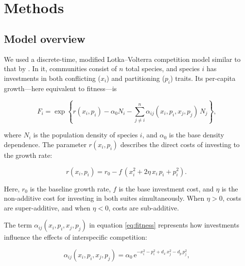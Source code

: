 
\section*{Methods}


\subsection*{Model overview}



We used a discrete-time, modified Lotka--Volterra competition model similar to
that by \citet{Northfield2013a}.
In it, communities consist of $n$ total species, and 
species $i$ has investments in both conflicting ($x_i$) and 
partitioning ($p_i$) traits.
Its per-capita growth---here equivalent to fitness---is

\begin{equation} \label{eq:fitness}
    F_{i} = \exp\left\{
        r(x_i, p_i)
        - \alpha_0 N_{i} 
        - \sum_{j \ne i}^{n}{
            \alpha_{ij}(x_i, p_i, x_j, p_j) \, N_j}
        \right\}
    \textrm{,}
\end{equation}


\noindent where $N_i$ is the population density of species $i$,
and $\alpha_0$ is the base density dependence.
The parameter $r(x_i, p_i)$ describes the direct costs of investing to
the growth rate:

\begin{equation} \label{eq:growth-rate}
    r(x_i, p_i) = r_0 - f \, \left( x_i^2 + 2 \eta \, x_i \, p_i + p_i^2 \right)
    \textrm{.}
\end{equation}

\noindent Here, $r_0$ is the baseline growth rate,
$f$ is the base investment cost, and
$\eta$ is the non-additive cost for investing in both suites 
simultaneously.
When $\eta > 0$, costs are super-additive, and 
when $\eta < 0$, costs are sub-additive.


The term $\alpha_{ij}(x_i, p_i, x_j, p_j)$ in equation \ref{eq:fitness}
represents how investments influence the effects
of interspecific competition:

\begin{equation} \label{eq:competition}
    \alpha_{ij}(x_i, p_i, x_j, p_j) = \alpha_0 \,
        \text{e}^{-x_i^2 - p_i^2 + d_x \, x_j^2 - d_p \, p_j^2 }
	\textrm{,}
\end{equation}


